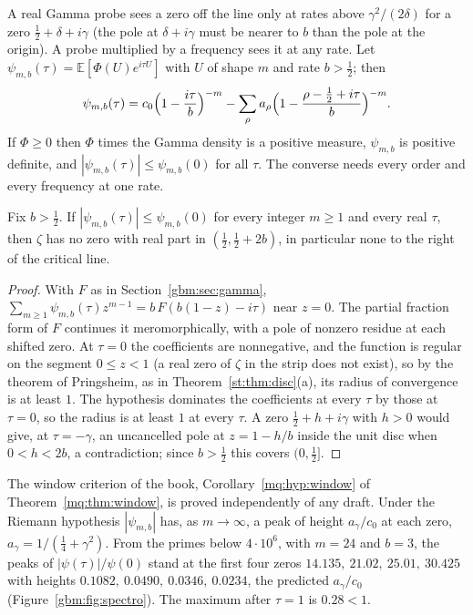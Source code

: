 A real Gamma probe sees a zero off the line only at rates above $\gamma^2/(2\delta)$ for a zero $\frac12+\delta+i\gamma$ (the pole at $\delta+i\gamma$ must be nearer to $b$ than the pole at the origin). A probe multiplied by a frequency sees it at any rate. Let $\psi_{m,b}(\tau)=\mathbb E[\Phi(U)e^{i\tau U}]$ with $U$ of shape $m$ and rate $b>\frac12$; then
\[
\psi_{m,b}(\tau)=c_0\Bigl(1-\frac{i\tau}b\Bigr)^{-m}-\sum_\rho a_\rho\Bigl(1-\frac{\rho-\frac12+i\tau}b\Bigr)^{-m}.
\]
If $\Phi\ge0$ then $\Phi$ times the Gamma density is a positive measure, $\psi_{m,b}$ is positive definite, and $|\psi_{m,b}(\tau)|\le\psi_{m,b}(0)$ for all $\tau$. The converse needs every order and every frequency at one rate.

\begin{proposition}\label{gbm:prop:modulated}
Fix $b>\frac12$. If $|\psi_{m,b}(\tau)|\le\psi_{m,b}(0)$ for every integer $m\ge1$ and every real $\tau$, then $\zeta$ has no zero with real part in $(\frac12,\frac12+2b)$, in particular none to the right of the critical line.
\end{proposition}

\begin{proof}
With $F$ as in Section~\ref{gbm:sec:gamma}, $\sum_{m\ge1}\psi_{m,b}(\tau)z^{m-1}=b\,F(b(1-z)-i\tau)$ near $z=0$. The partial fraction form of $F$ continues it meromorphically, with a pole of nonzero residue at each shifted zero. At $\tau=0$ the coefficients are nonnegative, and the function is regular on the segment $0\le z<1$ (a real zero of $\zeta$ in the strip does not exist), so by the theorem of Pringsheim, as in Theorem~\ref{st:thm:disc}(a), its radius of convergence is at least $1$. The hypothesis dominates the coefficients at every $\tau$ by those at $\tau=0$, so the radius is at least $1$ at every $\tau$. A zero $\frac12+h+i\gamma$ with $h>0$ would give, at $\tau=-\gamma$, an uncancelled pole at $z=1-h/b$ inside the unit disc when $0<h<2b$, a contradiction; since $b>\frac12$ this covers $(0,\frac12]$.
\end{proof}

The window criterion of the book, Corollary~\ref{mq:hyp:window} of Theorem~\ref{mq:thm:window}, is proved independently of any draft. Under the Riemann hypothesis $|\psi_{m,b}|$ has, as $m\to\infty$, a peak of height $a_\gamma/c_0$ at each zero, $a_\gamma=1/(\frac14+\gamma^2)$. From the primes below $4\cdot10^6$, with $m=24$ and $b=3$, the peaks of $|\psi(\tau)|/\psi(0)$ stand at the first four zeros $14.135,\ 21.02,\ 25.01,\ 30.425$ with heights $0.1082,\ 0.0490,\ 0.0346,\ 0.0234$, the predicted $a_\gamma/c_0$ (Figure~\ref{gbm:fig:spectro}). The maximum after $\tau=1$ is $0.28<1$.

